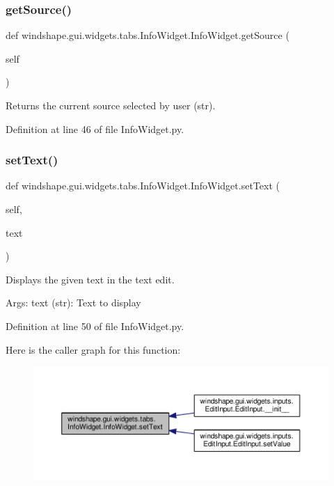 \subsubsection{\texorpdfstring{get\+Source()}{getSource()}}
{\footnotesize\ttfamily def windshape.\+gui.\+widgets.\+tabs.\+Info\+Widget.\+Info\+Widget.\+get\+Source (\begin{DoxyParamCaption}\item[{}]{self }\end{DoxyParamCaption})}

\begin{DoxyVerb}Returns the current source selected by user (str).\end{DoxyVerb}
 

Definition at line 46 of file Info\+Widget.\+py.

\mbox{\label{classwindshape_1_1gui_1_1widgets_1_1tabs_1_1_info_widget_1_1_info_widget_ab81ead09bdf6f0b450f8b435038113bd}} 
\subsubsection{\texorpdfstring{set\+Text()}{setText()}}
{\footnotesize\ttfamily def windshape.\+gui.\+widgets.\+tabs.\+Info\+Widget.\+Info\+Widget.\+set\+Text (\begin{DoxyParamCaption}\item[{}]{self,  }\item[{}]{text }\end{DoxyParamCaption})}

\begin{DoxyVerb}Displays the given text in the text edit.

Args:
    text (str): Text to display
\end{DoxyVerb}
 

Definition at line 50 of file Info\+Widget.\+py.

Here is the caller graph for this function\+:\nopagebreak
\begin{figure}[H]
\begin{center}
\leavevmode
\includegraphics[width=350pt]{classwindshape_1_1gui_1_1widgets_1_1tabs_1_1_info_widget_1_1_info_widget_ab81ead09bdf6f0b450f8b435038113bd_icgraph}
\end{center}
\end{figure}


